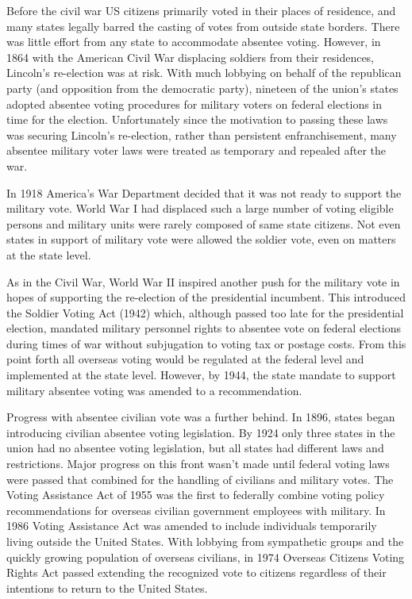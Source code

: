 Before the civil war US citizens primarily voted in their places of residence,
and many states legally barred the casting of votes from outside state borders.
There was little effort from any state to accommodate absentee voting. However,
in 1864 with the American Civil War displacing soldiers from their residences,
Lincoln's re-election was at risk. With much lobbying on behalf of the
republican party (and opposition from the democratic party), nineteen of the
union's states adopted absentee voting procedures for military voters on
federal elections in time for the election. Unfortunately since the motivation
to passing these laws was securing Lincoln's re-election, rather than
persistent enfranchisement, many absentee military voter laws were treated as
temporary and repealed after the war.

In 1918 America's War Department decided that it was not ready to support the
military vote. World War I had displaced such a large number of voting eligible
persons and military units were rarely composed of same state citizens. Not
even states in support of military vote were allowed the soldier vote, even on
matters at the state level.

As in the Civil War, World War II inspired another push for the military vote
in hopes of supporting the re-election of the presidential incumbent. This
introduced the Soldier Voting Act (1942) which, although passed too late for
the presidential election, mandated military personnel rights to absentee vote
on federal elections during times of war without subjugation to voting tax or
postage costs. From this point forth all overseas voting would be regulated at
the federal level and implemented at the state level. However, by 1944, the
state mandate to support military absentee voting was amended to a
recommendation.

Progress with absentee civilian vote was a further behind. In 1896, states
began introducing civilian absentee voting legislation. By 1924 only three
states in the union had no absentee voting legislation, but all states had
different laws and restrictions. Major progress on this front wasn't made until
federal voting laws were passed that combined for the handling of civilians and
military votes. The Voting Assistance Act of 1955 was the first to federally
combine voting policy recommendations for overseas civilian government
employees with military. In 1986 Voting Assistance Act was amended to include
individuals temporarily living outside the United States. With lobbying from
sympathetic groups and the quickly growing population of overseas civilians, in
1974 Overseas Citizens Voting Rights Act passed extending the recognized vote
to citizens regardless of their intentions to return to the United States.

